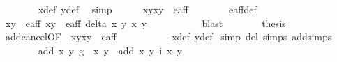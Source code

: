 \begin{isabellebody}
\ \ \ \ \ \ \isamarkupfalse%
\ x{}{\isacharunderscore}def\ y{}{\isacharunderscore}def\ \isamarkupfalse%
\ simp\isanewline
\ \ \ \ \isamarkupfalse%
\ {\isachardoublequoteopen}{\isacharparenleft}{\isacharparenleft}x{\isacharcomma}y{\isacharparenright}{\isacharcomma}{\isacharparenleft}x{}{\isacharcomma}y{}{\isacharparenright}{\isacharparenright}\ {\isasymin}\ e{\isacharunderscore}aff{\isacharunderscore}{}{\isachardoublequoteclose}\isanewline
\ \ \ \ \ \ \isamarkupfalse%
\ e{\isacharunderscore}aff{\isacharunderscore}{}{\isacharunderscore}def\ \isanewline
\ \ \ \ \ \ \isamarkupfalse%
\ {\isacartoucheopen}{\isacharparenleft}x{\isacharcomma}y{\isacharparenright}\ {\isasymin}\ e{\isacharunderscore}aff{\isacartoucheclose}\ {\isacartoucheopen}{\isacharparenleft}x{}{\isacharcomma}y{}{\isacharparenright}\ {\isasymin}\ e{\isacharunderscore}aff{\isacartoucheclose}\ {\isacartoucheopen}delta\ x\ y\ x{}\ y{}\ {\isasymnoteq}\ {}{\isacartoucheclose}\ \isanewline
\ \ \ \ \ \ \isamarkupfalse%
\ blast\isanewline
\ \ \ \ \isamarkupfalse%
\ \isamarkupfalse%
\ {\isacharquery}thesis\isanewline
\ \ \ \ \ \ \isamarkupfalse%
\ add{\isacharunderscore}cancel{\isacharunderscore}{}{\isacharbrackleft}OF\ {\isacharunderscore}\ {\isacartoucheopen}{\isacharparenleft}{\isacharparenleft}x{\isacharcomma}y{\isacharparenright}{\isacharcomma}{\isacharparenleft}x{}{\isacharcomma}y{}{\isacharparenright}{\isacharparenright}\ {\isasymin}\ e{\isacharunderscore}aff{\isacharunderscore}{}{\isacartoucheclose}\ \ {\isacharbrackright}\ \isanewline
\ \ \ \ \ \ \isamarkupfalse%
\ x{}{\isacharunderscore}def\ y{}{\isacharunderscore}def\ \isamarkupfalse%
{\isacharparenleft}simp\ del{\isacharcolon}\ {\isasymtau}{\isachardot}simps\ add{\isachardot}simps{\isacharparenright}\isanewline
\ \ \ \ \ \ \isamarkupfalse%
\ {\isacartoucheopen}add\ {\isacharparenleft}x{\isacharcomma}\ y{\isacharparenright}\ {\isacharparenleft}g{\isacharprime}\ {\isacharparenleft}{\isasymtau}\ {\isacharparenleft}x{\isacharprime}{\isacharcomma}\ y{\isacharprime}{\isacharparenright}{\isacharparenright}{\isacharparenright}\ {\isacharequal}\ add\ {\isacharparenleft}x{\isacharcomma}\ y{\isacharparenright}\ {\isacharparenleft}i\ {\isacharparenleft}x{\isacharcomma}\ y{\isacharparenright}{\isacharparenright}{\isacartoucheclose}\ \isamarkupfalse%

\end{isabellebody}

